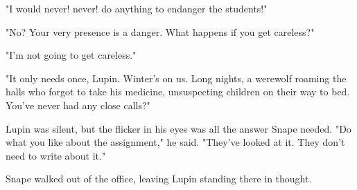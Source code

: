 "I would never! never! do anything to endanger the students!"

"No? Your very presence is a danger. What happens if you get careless?"

"I'm not going to get careless."

"It only needs once, Lupin. Winter's on us. Long nights, a werewolf roaming the halls who forgot to take his medicine, unsuspecting children on their way to bed. You've never had any close calls?"

Lupin was silent, but the flicker in his eyes was all the answer Snape needed. "Do what you like about the assignment," he said. "They've looked at it. They don't need to write about it."

Snape walked out of the office, leaving Lupin standing there in thought.

\sbreak


